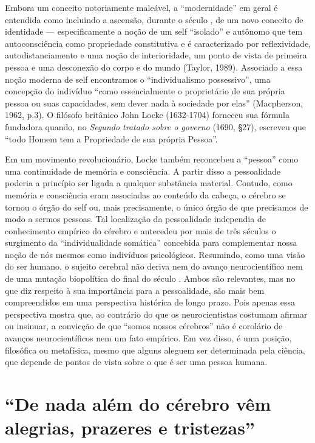 Embora um conceito notoriamente maleável, a ``modernidade'' em geral é
entendida como incluindo a ascensão, durante o século , de um novo
conceito de identidade --- especificamente a noção de um self
``isolado'' e autônomo que tem autoconsciência como propriedade
constitutiva e é caracterizado por reflexividade, autodistanciamento e
uma noção de interioridade, um ponto de vista de primeira pessoa e uma
desconexão do corpo e do mundo (Taylor, 1989). Associado a essa noção
moderna de self encontramos o ``individualismo possessivo'', uma
concepção do indivíduo ``como essencialmente o proprietário de sua
própria pessoa ou suas capacidades, sem dever nada à sociedade por
elas'' (Macpherson, 1962, p.3). O filósofo britânico John Locke
(1632-1704) forneceu sua fórmula fundadora quando, no \emph{Segundo
tratado sobre o governo} (1690, §27), escreveu que ``todo Homem tem a
Propriedade de sua própria Pessoa''.

Em um movimento revolucionário, Locke também reconcebeu a ``pessoa''
como uma continuidade de memória e consciência. A partir disso a
pessoalidade poderia a princípio ser ligada a qualquer substância
material. Contudo, como memória e consciência eram associadas ao
conteúdo da cabeça, o cérebro se tornou o órgão do self ou, mais
precisamente, o único órgão de que precisamos de modo a sermos pessoas.
Tal localização da pessoalidade independia de conhecimento empírico do
cérebro e antecedeu por mais de três séculos o surgimento da
``individualidade somática'' concebida para complementar nossa noção de
nós mesmos como indivíduos psicológicos. Resumindo, como uma visão do
ser humano, o sujeito cerebral não deriva nem do avanço neurocientífico
nem de uma mutação biopolítica do final do século . Ambos são
relevantes, mas no que diz respeito à sua importância para a
pessoalidade, são mais bem compreendidos em uma perspectiva histórica de
longo prazo. Pois apenas essa perspectiva mostra que, ao contrário do
que os neurocientistas costumam afirmar ou insinuar, a convicção de que
``somos nossos cérebros'' não é corolário de avanços neurocientíficos
nem um fato empírico. Em vez disso, é uma posição, filosófica ou
metafísica, mesmo que alguns aleguem ser determinada pela ciência, que
depende de pontos de vista sobre o que é ser uma pessoa humana.

\chapter{``De nada além do cérebro vêm alegrias, prazeres e tristezas''}

